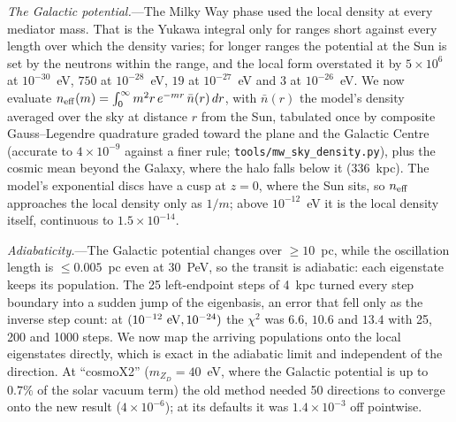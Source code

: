 \documentclass[11pt,a4paper]{article}
\newcommand{\file}[1]{\nolinkurl{#1}}
\newcommand{\mzd}{m_{Z_D}}
\begin{document}
\textit{The Galactic potential.}---The Milky Way phase used the local density at every mediator
mass. That is the Yukawa integral only for ranges short against every length over which the
density varies; for longer ranges the potential at the Sun is set by the neutrons within the
range, and the local form overstated it by $5\times10^{6}$ at $10^{-30}$~eV, $750$ at
$10^{-28}$~eV, $19$ at $10^{-27}$~eV and $3$ at $10^{-26}$~eV. We now evaluate
$n_{\rm eff}(m) = \int_0^\infty m^2 r\,e^{-mr}\,\bar n(r)\,dr$, with $\bar n(r)$ the model's density
averaged over the sky at distance $r$ from the Sun, tabulated once by composite Gauss--Legendre
quadrature graded toward the plane and the Galactic Centre (accurate to $4\times10^{-9}$ against
a finer rule; \file{tools/mw\_sky\_density.py}), plus the cosmic mean beyond the Galaxy, where the
halo falls below it ($336$~kpc). The model's exponential discs have a cusp at $z = 0$, where the
Sun sits, so $n_{\rm eff}$ approaches the local density only as $1/m$; above $10^{-12}$~eV it is the
local density itself, continuous to $1.5\times10^{-14}$.

\textit{Adiabaticity.}---The Galactic potential changes over $\ge10$~pc, while the oscillation
length is $\le0.005$~pc even at 30~PeV, so the transit is adiabatic: each eigenstate keeps its
population. The 25 left-endpoint steps of 4~kpc turned every step boundary into a sudden jump of
the eigenbasis, an error that fell only as the inverse step count: at $(10^{-12}~{\rm eV},
10^{-24})$ the $\chi^2$ was $6.6$, $10.6$ and $13.4$ with 25, 200 and 1000 steps. We now map the
arriving populations onto the local eigenstates directly, which is exact in the adiabatic limit
and independent of the direction. At ``cosmoX2'' ($\mzd = 40$~eV, where the Galactic potential is
up to $0.7\%$ of the solar vacuum term) the old method needed 50 directions to converge onto the
new result ($4\times10^{-6}$); at its defaults it was $1.4\times10^{-3}$ off pointwise.
\end{document}

